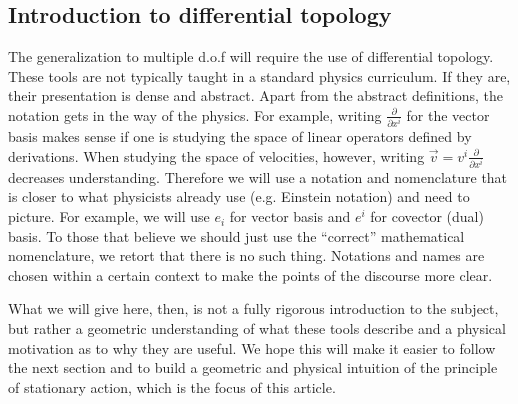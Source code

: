 \documentclass[10pt,twocolumn, nofootinbib]{revtex4-2}
\begin{document}
\subsection*{Introduction to differential topology}

The generalization to multiple d.o.f will require the use of differential topology. These tools are not typically taught in a standard physics curriculum. If they are, their presentation is dense and abstract.
Apart from the abstract definitions, the notation gets in the way of the physics. For example, writing $\frac{\partial}{\partial x^i}$ for the vector basis makes sense if one is studying the space of linear operators defined by derivations. When studying the space of velocities, however, writing $\vec{v} = v^i\frac{\partial}{\partial x^i}$ decreases understanding. Therefore we will use a notation and nomenclature that is closer to what physicists already use (e.g. Einstein notation) and need to picture. For example, we will use $e_i$ for vector basis and $e^i$ for covector (dual) basis. To those that believe we should just use the ``correct'' mathematical nomenclature, we retort that there is no such thing. Notations and names are chosen within a certain context to make the points of the discourse more clear.

What we will give here, then, is not a fully rigorous introduction to the subject, but rather a geometric understanding of what these tools describe and a physical motivation as to why they are useful. We hope this will make it easier to follow the next section and to build a geometric and physical intuition of the principle of stationary action, which is the focus of this article.



\end{document}
